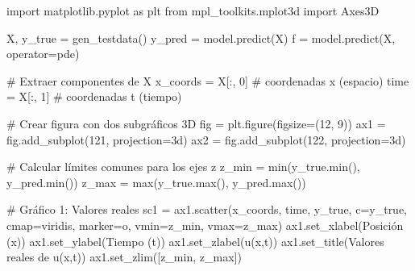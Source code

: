 \documentclass[
  spanish,
  us-letterpaper,
  DIV=11,
  numbers=noendperiod]{scrreprt}
\newenvironment{Shaded}{\begin{snugshade}}{\end{snugshade}}
\newcommand{\BuiltInTok}[1]{\textcolor[rgb]{0.00,0.23,0.31}{#1}}
\newcommand{\CommentTok}[1]{\textcolor[rgb]{0.37,0.37,0.37}{#1}}
\newcommand{\DecValTok}[1]{\textcolor[rgb]{0.68,0.00,0.00}{#1}}
\newcommand{\ImportTok}[1]{\textcolor[rgb]{0.00,0.46,0.62}{#1}}
\newcommand{\NormalTok}[1]{\textcolor[rgb]{0.00,0.23,0.31}{#1}}
\newcommand{\OperatorTok}[1]{\textcolor[rgb]{0.37,0.37,0.37}{#1}}
\newcommand{\StringTok}[1]{\textcolor[rgb]{0.13,0.47,0.30}{#1}}
\theoremstyle{plain}
\theoremstyle{definition}
\theoremstyle{remark}
\begin{document}
\begin{Shaded}
\begin{Highlighting}[]
\ImportTok{import}\NormalTok{ matplotlib.pyplot }\ImportTok{as}\NormalTok{ plt }
\ImportTok{from}\NormalTok{ mpl\_toolkits.mplot3d }\ImportTok{import}\NormalTok{ Axes3D}

\NormalTok{X, y\_true }\OperatorTok{=}\NormalTok{ gen\_testdata()}
\NormalTok{y\_pred }\OperatorTok{=}\NormalTok{ model.predict(X)}
\NormalTok{f }\OperatorTok{=}\NormalTok{ model.predict(X, operator}\OperatorTok{=}\NormalTok{pde)}

\CommentTok{\# Extraer componentes de X}
\NormalTok{x\_coords }\OperatorTok{=}\NormalTok{ X[:, }\DecValTok{0}\NormalTok{]  }\CommentTok{\# coordenadas x (espacio)}
\NormalTok{time }\OperatorTok{=}\NormalTok{ X[:, }\DecValTok{1}\NormalTok{]      }\CommentTok{\# coordenadas t (tiempo)}

\CommentTok{\# Crear figura con dos subgráficos 3D}
\NormalTok{fig }\OperatorTok{=}\NormalTok{ plt.figure(figsize}\OperatorTok{=}\NormalTok{(}\DecValTok{12}\NormalTok{, }\DecValTok{9}\NormalTok{))}
\NormalTok{ax1 }\OperatorTok{=}\NormalTok{ fig.add\_subplot(}\DecValTok{121}\NormalTok{, projection}\OperatorTok{=}\StringTok{\textquotesingle{}3d\textquotesingle{}}\NormalTok{)}
\NormalTok{ax2 }\OperatorTok{=}\NormalTok{ fig.add\_subplot(}\DecValTok{122}\NormalTok{, projection}\OperatorTok{=}\StringTok{\textquotesingle{}3d\textquotesingle{}}\NormalTok{)}

\CommentTok{\# Calcular límites comunes para los ejes z}
\NormalTok{z\_min }\OperatorTok{=} \BuiltInTok{min}\NormalTok{(y\_true.}\BuiltInTok{min}\NormalTok{(), y\_pred.}\BuiltInTok{min}\NormalTok{())}
\NormalTok{z\_max }\OperatorTok{=} \BuiltInTok{max}\NormalTok{(y\_true.}\BuiltInTok{max}\NormalTok{(), y\_pred.}\BuiltInTok{max}\NormalTok{())}

\CommentTok{\# Gráfico 1: Valores reales}
\NormalTok{sc1 }\OperatorTok{=}\NormalTok{ ax1.scatter(x\_coords, time, y\_true, c}\OperatorTok{=}\NormalTok{y\_true,}
\NormalTok{                cmap}\OperatorTok{=}\StringTok{\textquotesingle{}viridis\textquotesingle{}}\NormalTok{, marker}\OperatorTok{=}\StringTok{\textquotesingle{}o\textquotesingle{}}\NormalTok{, vmin}\OperatorTok{=}\NormalTok{z\_min, vmax}\OperatorTok{=}\NormalTok{z\_max)}
\NormalTok{ax1.set\_xlabel(}\StringTok{\textquotesingle{}Posición (x)\textquotesingle{}}\NormalTok{)}
\NormalTok{ax1.set\_ylabel(}\StringTok{\textquotesingle{}Tiempo (t)\textquotesingle{}}\NormalTok{)}
\NormalTok{ax1.set\_zlabel(}\StringTok{\textquotesingle{}u(x,t)\textquotesingle{}}\NormalTok{)}
\NormalTok{ax1.set\_title(}\StringTok{\textquotesingle{}Valores reales de u(x,t)\textquotesingle{}}\NormalTok{)}
\NormalTok{ax1.set\_zlim([z\_min, z\_max])}


\end{Highlighting}
\end{Shaded}
\end{document}
